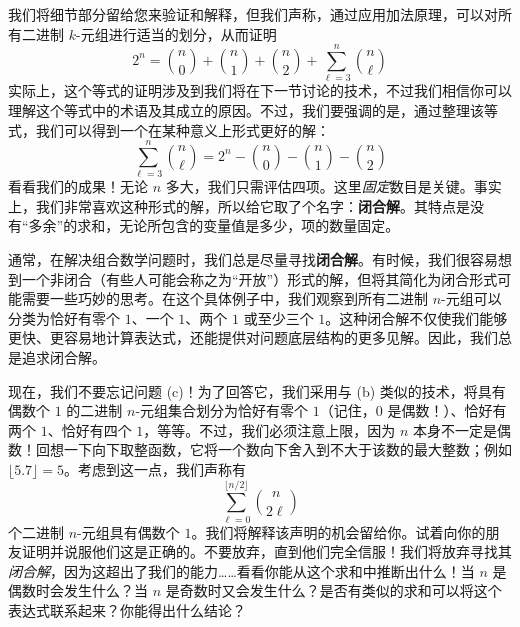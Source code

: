 \begin{example}
    我们将细节部分留给您来验证和解释，但我们声称，通过应用加法原理，可以对所有二进制 $k$-元组进行适当的划分，从而证明
    \[2^n = {n \choose 0} + {n \choose 1} + {n \choose 2} + \sum_{\ell = 3}^{n} {n \choose \ell}\]
    实际上，这个等式的证明涉及到我们将在下一节讨论的技术，不过我们相信你可以理解这个等式中的术语及其成立的原因。不过，我们要强调的是，通过整理该等式，我们可以得到一个在某种意义上形式更好的解：
    \[\sum_{\ell = 3}^{n} {n \choose \ell} = 2^n - {n \choose 0} - {n \choose 1} - {n \choose 2}\]
    看看我们的成果！无论 $n$ 多大，我们只需评估四项。这里\emph{固定}数目是关键。事实上，我们非常喜欢这种形式的解，所以给它取了个名字：\textbf{闭合解}。其特点是没有``多余''的求和，无论所包含的变量值是多少，项的数量固定。

    通常，在解决组合数学问题时，我们总是尽量寻找\textbf{闭合解}。有时候，我们很容易想到一个非闭合（有些人可能会称之为``开放''）形式的解，但将其简化为闭合形式可能需要一些巧妙的思考。在这个具体例子中，我们观察到所有二进制 $n$-元组可以分类为恰好有零个 $1$、一个 $1$、两个 $1$ 或至少三个 $1$。这种闭合解不仅使我们能够更快、更容易地计算表达式，还能提供对问题底层结构的更多见解。因此，我们总是追求闭合解。

    现在，我们不要忘记问题 (c)！为了回答它，我们采用与 (b) 类似的技术，将具有偶数个 $1$ 的二进制 $n$-元组集合划分为恰好有零个 $1$（记住，$0$ 是偶数！）、恰好有两个 $1$、恰好有四个 $1$，等等。不过，我们必须注意上限，因为 $n$ 本身不一定是偶数！回想一下向下取整函数，它将一个数向下舍入到不大于该数的最大整数；例如 $\lfloor 5.7 \rfloor = 5$。考虑到这一点，我们声称有
    \[\sum_{\ell=0}^{\lfloor n/2 \rfloor} {n \choose 2\ell}\]
    个二进制 $n$-元组具有偶数个 $1$。我们将解释该声明的机会留给你。试着向你的朋友证明并说服他们这是正确的。不要放弃，直到他们完全信服！我们将放弃寻找其\emph{闭合解}，因为这超出了我们的能力……看看你能从这个求和中推断出什么！当 $n$ 是偶数时会发生什么？当 $n$ 是奇数时又会发生什么？是否有类似的求和可以将这个表达式联系起来？你能得出什么结论？
\end{example}

